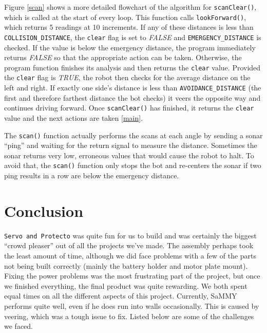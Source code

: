 \documentclass[11pt]{article}
\begin{document}
Figure \ref{scan} shows a more detailed flowchart of the algorithm for \texttt{scanClear()}, which is called at the start of every loop.  
This function calls \texttt{lookForward()}, which returns 5 readings at 10\degree \hspace{1pt} increments. If any of these distances is less than \texttt{COLLISION\_DISTANCE}, the \texttt{clear} flag is set to \emph{FALSE} and \texttt{EMERGENCY\_DISTANCE} is checked. If the value is below the emergency distance, the program immediately returns \emph{FALSE} so that the appropriate action can be taken. Otherwise, the program function finishes its analysis and then returns the \texttt{clear} value.
Provided the \texttt{clear} flag is \emph{TRUE}, the robot then checks for the average distance on the left and right. If exactly one side's distance is less than \texttt{AVOIDANCE\_DISTANCE} (the first and therefore farthest distance the bot checks) it veers the opposite way and continues driving forward. Once \texttt{scanClear()} has finished, it returns the \texttt{clear} value and the next actions are taken \ref{main}.


The \texttt{scan()} function actually performs the scans at each angle by sending a sonar ``ping'' and waiting for the return signal to measure the distance. Sometimes the sonar returns very low, erroneous values that would cause the robot to halt. To avoid that, the \texttt{scan()} function only stops the bot and re-centers the sonar if two ping results in a row are below the emergency distance. 


\section{Conclusion}
\texttt{Servo and Protecto} was quite fun for us to build and was certainly the biggest ``crowd pleaser'' out of all the projects we've made.  The assembly perhaps took the least amount of time, although we did face problems with a few of the parts not being built correctly (mainly the battery holder and motor plate mount).  Fixing the power problems was the most frustrating part of the project, but once we finished everything, the final product was quite rewarding.  We both spent equal times on all the different aspects of this project.  Currently, SaMMY performs quite well, even if he does run into walls occasionally.  This is caused by veering, which was a tough issue to fix. Listed below are some of the challenges we faced.
	
\end{document}
